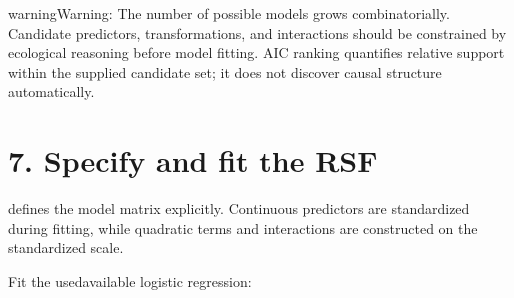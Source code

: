 \documentclass[letterpaper,10pt,english]{sphinxmanual}
\begin{document}
\begin{sphinxadmonition}{warning}{Warning:}
\sphinxAtStartPar
The number of possible models grows combinatorially. Candidate predictors, transformations, and interactions should be constrained by ecological reasoning before model fitting. AIC ranking quantifies relative support within the supplied candidate set; it does not discover causal structure automatically.
\end{sphinxadmonition}


\section{7. Specify and fit the RSF}
\label{\detokenize{getting_started:specify-and-fit-the-rsf}}
\sphinxAtStartPar
{} defines the model matrix explicitly. Continuous predictors are standardized during fitting, while quadratic terms and interactions are constructed on the standardized scale.

\begin{sphinxVerbatim}[commandchars=\\\{\}]
  
    \PYG{p}{[}
    \PYG{p}{]}
    \PYG{p}{[}
    \PYG{p}{]}
    \PYG{p}{[}
         
    \PYG{p}{]}
\end{sphinxVerbatim}

\sphinxAtStartPar
Fit the used\textendash{}available logistic regression:

\begin{sphinxVerbatim}[commandchars=\\\{\}]
     

\end{sphinxVerbatim}
\end{document}
